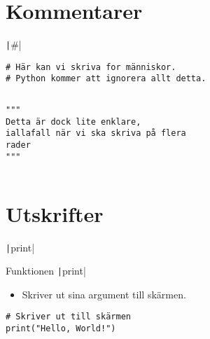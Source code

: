 \section{Kommentarer}

\begin{frame}[fragile]
  \begin{center}
    \texttt|#|
  \end{center}
\end{frame}

\begin{frame}[fragile]
  \begin{example}
    \begin{verbatim}
# Här kan vi skriva for människor.
# Python kommer att ignorera allt detta.
    \end{verbatim}
  \end{example}
\end{frame}

\begin{frame}[fragile]
  \inputminted[highlightlines={16,24},linenos,firstline=11]{python}{examples/age.py}
\end{frame}

\begin{frame}[fragile]
  \begin{example}
    \begin{verbatim}
"""
Detta är dock lite enklare,
iallafall när vi ska skriva på flera
rader
"""
    \end{verbatim}
  \end{example}
\end{frame}

\begin{frame}[fragile]
  \inputminted[highlightlines={1-10},linenos]{python}{examples/age.py}
\end{frame}


\section{Utskrifter}

\begin{frame}[fragile]
  \begin{center}
    \texttt|print|
  \end{center}
\end{frame}

\begin{frame}[fragile]
  \begin{block}{Funktionen \texttt|print|}
    \begin{itemize}
      \item Skriver ut sina argument till skärmen.
    \end{itemize}
  \end{block}

  \pause

  \begin{example}
    \begin{verbatim}
# Skriver ut till skärmen
print("Hello, World!")
    \end{verbatim}
  \end{example}
\end{frame}

